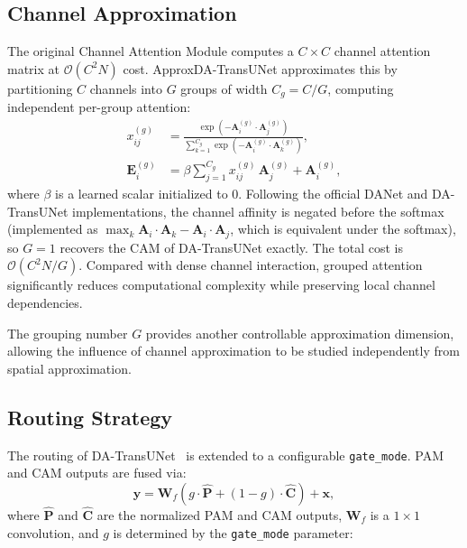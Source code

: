 \subsection{Channel Approximation}

The original Channel Attention Module computes a $C{\times}C$ channel attention matrix at $\mathcal{O}(C^2N)$ cost. ApproxDA-TransUNet approximates this by partitioning $C$ channels into $G$ groups of width $C_g = C/G$, computing independent per-group attention:
\begin{equation}
\begin{aligned}
  x^{(g)}_{ij} &= \frac{\exp(-\mathbf{A}^{(g)}_i \cdot \mathbf{A}^{(g)}_j)}{\sum_{k=1}^{C_g}\exp(-\mathbf{A}^{(g)}_i \cdot \mathbf{A}^{(g)}_k)}, \\
  \mathbf{E}^{(g)}_i &= \beta \sum_{j=1}^{C_g} x^{(g)}_{ij}\,\mathbf{A}^{(g)}_j + \mathbf{A}^{(g)}_i,
\end{aligned}
  \label{eq:groupedcam}
\end{equation}
where $\beta$ is a learned scalar initialized to 0. Following the official DANet and DA-TransUNet implementations, the channel affinity is negated before the softmax (implemented as $\max_k \mathbf{A}_i\cdot\mathbf{A}_k - \mathbf{A}_i\cdot\mathbf{A}_j$, which is equivalent under the softmax), so $G{=}1$ recovers the CAM of DA-TransUNet exactly. The total cost is $\mathcal{O}(C^2N/G)$. Compared with dense channel interaction, grouped attention significantly reduces computational complexity while preserving local channel dependencies.

The grouping number $G$ provides another controllable approximation dimension, allowing the influence of channel approximation to be studied independently from spatial approximation.

\subsection{Routing Strategy}

The routing of DA-TransUNet~\cite{sun2024datransunet} is extended to a configurable \texttt{gate\_mode}. PAM and CAM outputs are fused via:
\begin{equation}
  \mathbf{y} = \mathbf{W}_f\!\left(g \cdot \hat{\mathbf{P}} + (1-g) \cdot \hat{\mathbf{C}}\right) + \mathbf{x},
  \label{eq:fusion}
\end{equation}
where $\hat{\mathbf{P}}$ and $\hat{\mathbf{C}}$ are the normalized PAM and CAM outputs, $\mathbf{W}_f$ is a $1{\times}1$ convolution, and $g$ is determined by the \texttt{gate\_mode} parameter:

